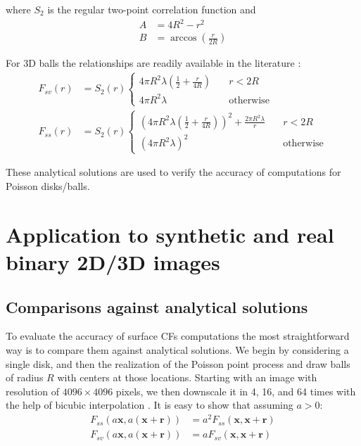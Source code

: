 \documentclass[reprint,amsmath,amssymb,aps,pre]{revtex4-1}
\begin{document}
where $S_2$ is the regular two-point correlation function and
\begin{align*}
  A &= 4R^2 - r^2 \\
  B &= \arccos(\frac{r}{2R})
\end{align*}

For 3D balls the relationships are readily available in the literature
\cite{Torq_book}\cite{Ma_Torq}:
\begin{align*}
  F_{sv}(r) &= S_2(r) \left\{
  \begin{array}{ll}
    4\pi R^2\lambda(\frac{1}{2} + \frac{r}{4R}) & \quad r<2R \\
    4\pi R^2\lambda & \quad \text{otherwise}
  \end{array} \right. \\
  F_{ss}(r) &= S_2(r) \left\{
  \begin{array}{ll}
    {(4\pi R^2 \lambda (\frac{1}{2} + \frac{r}{4R}))^2 + \frac{2\pi R^2 \lambda}{r}} & \quad r<2R \\
    (4\pi R^2 \lambda)^2 & \quad \text{otherwise}
  \end{array} \right.
\end{align*}

These analytical solutions are used to verify the accuracy of computations for
Poisson disks/balls.

\section{Application to synthetic and real binary 2D/3D images}
\label{sec:results}
\subsection{Comparisons against analytical solutions}
\label{sec:comparison}
To evaluate the accuracy of surface CFs computations the most straightforward
way is to compare them against analytical solutions. We begin by considering a
single disk, and then the realization of the Poisson point process and draw
balls of radius $R$ with centers at those locations. Starting with an image
with resolution of $4096 \times 4096$ pixels, we then downscale it in 4, 16, and
64 times with the help of bicubic interpolation \cite{mexicans}. It is easy to
show that assuming $a > 0$:
\begin{align*}
  F_{ss}(a \mathbf{x}, a(\mathbf{x} + \mathbf{r})) &= a^2 F_{ss}(\mathbf{x},
  \mathbf{x} + \mathbf{r}) \\
  F_{sv}(a \mathbf{x}, a(\mathbf{x} + \mathbf{r})) &= a F_{sv}(\mathbf{x},
  \mathbf{x} + \mathbf{r})
\end{align*}
\end{document}

